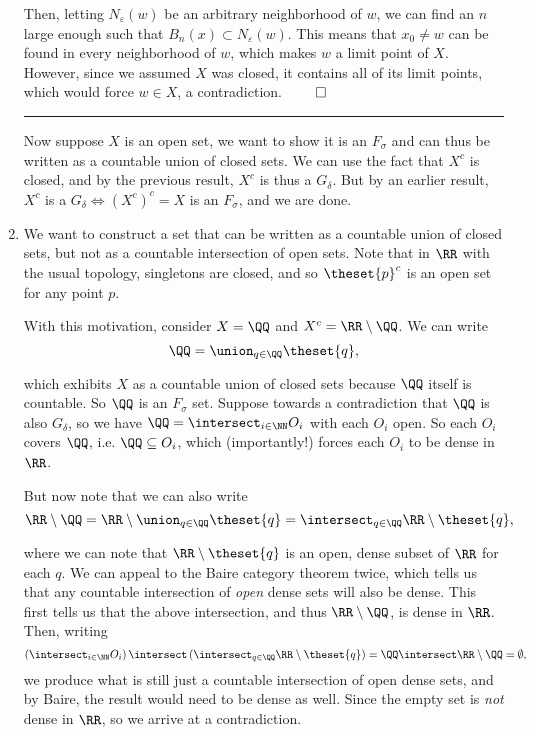 \begin{solution}
\begin{enumerate}
  Then, letting $N_\varepsilon(w)$ be an arbitrary neighborhood of $w$, we can find an $n$ large enough such that $B_n(x) \subset N_\varepsilon(w)$. This means that $x_0 \neq w$ can be found in every neighborhood of $w$, which makes $w$ a limit point of $X$. However, since we assumed $X$ was closed, it contains all of its limit points, which would force $w \in X$, a contradiction. $\qed$

  \vspace{1em}\hrule

  Now suppose $X$ is an open set, we want to show it is an $F_\sigma$ and can thus be written as a countable union of closed sets. We can use the fact that $X^c$ is closed, and by the previous result, $X^c$ is thus a $G_\delta$. But by an earlier result, $X^c$ is a $G_\delta \iff (X^c)^c = X$ is an $F_\sigma$, and we are done.

  \item We want to construct a set that can be written as a countable union of closed sets, but not as a countable intersection of open sets. Note that in $\RR$ with the usual topology, singletons are closed, and so $\theset{p}^c$ is an open set for any point $p$.

  With this motivation, consider $X = \QQ$ and $X^c = \RR \setminus \QQ$. We can write
  $$
  \QQ = \union_{q \in \QQ} \theset{q},
  $$

  which exhibits $X$ as a countable union of closed sets because $\QQ$ itself is countable. So $\QQ$ is an $F_\sigma$ set. Suppose towards a contradiction that $\QQ$ is also $G_\delta$, so we have $\QQ = \intersect_{i\in\NN}O_i$ with each $O_i$ open. So each $O_{i}$ covers $\QQ$, i.e. $\QQ \subseteq O_{i}$, which (importantly!) forces each $O_i$ to be dense in $\RR$.

  But now note that we can also write
  $$
  \RR \setminus \QQ = \RR \setminus \union_{q\in \QQ} \theset{q} = \intersect_{q\in\QQ} \RR\setminus \theset{q},
  $$

  where we can note that $\RR\setminus\theset{q}$ is an open, dense subset of $\RR$ for each $q$. We can appeal to the Baire category theorem twice, which tells us that any countable intersection of \textit{open} dense sets will also be dense. This first tells us that the above intersection, and thus $\RR\setminus\QQ$, is dense in $\RR$. Then, writing
  $$
  \left(\intersect_{i\in \NN} O_i\right) \intersect \left(\intersect_{q\in\QQ} \RR\setminus\theset{q}\right) = \QQ \intersect \RR\setminus\QQ = \emptyset,
  $$
  we produce what is still just a countable intersection of open dense sets, and by Baire, the result would need to be dense as well. Since the empty set is \textit{not} dense in $\RR$, so we arrive at a contradiction.
\end{enumerate}
\end{solution}

